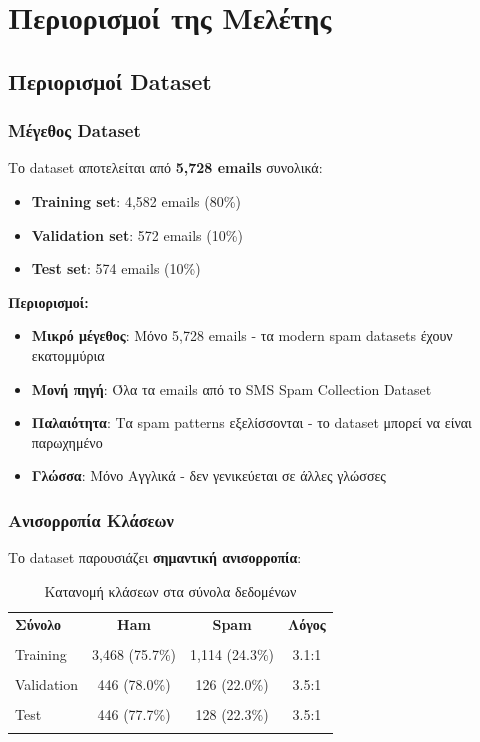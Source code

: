 \documentclass[12pt,a4paper,twoside]{book}
\begin{document}
\section{Περιορισμοί της Μελέτης}

\subsection{Περιορισμοί Dataset}

\subsubsection{Μέγεθος Dataset}

Το dataset αποτελείται από \textbf{5,728 emails} συνολικά:

\begin{itemize}
    \item \textbf{Training set}: 4,582 emails (80\%)
    \item \textbf{Validation set}: 572 emails (10\%)
    \item \textbf{Test set}: 574 emails (10\%)
\end{itemize}

\textbf{Περιορισμοί:}
\begin{itemize}
    \item \textbf{Μικρό μέγεθος}: Μόνο 5,728 emails - τα modern spam datasets έχουν εκατομμύρια
    \item \textbf{Μονή πηγή}: Όλα τα emails από το SMS Spam Collection Dataset
    \item \textbf{Παλαιότητα}: Τα spam patterns εξελίσσονται - το dataset μπορεί να είναι παρωχημένο
    \item \textbf{Γλώσσα}: Μόνο Αγγλικά - δεν γενικεύεται σε άλλες γλώσσες
\end{itemize}

\subsubsection{Ανισορροπία Κλάσεων}

Το dataset παρουσιάζει \textbf{σημαντική ανισορροπία}:

\begin{table}[H]
    \centering
    \begin{tabular}{lccc}
        \hline
        \textbf{Σύνολο} & \textbf{Ham}   & \textbf{Spam}  & \textbf{Λόγος} \\\\
        \hline
        Training        & 3,468 (75.7\%) & 1,114 (24.3\%) & 3.1:1          \\\\
        Validation      & 446 (78.0\%)   & 126 (22.0\%)   & 3.5:1          \\\\
        Test            & 446 (77.7\%)   & 128 (22.3\%)   & 3.5:1          \\\\
        \hline
    \end{tabular}
    \caption{Κατανομή κλάσεων στα σύνολα δεδομένων}
\end{table}
\end{document}
